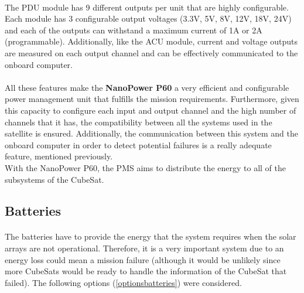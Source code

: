 \paragraph{}The PDU module has 9 different outputs per unit that are highly configurable. Each module has 3 configurable output voltages (3.3V, 5V, 8V, 12V, 18V, 24V) and each of the outputs can withstand a maximum current of 1A or 2A (programmable). Additionally, like the ACU module, current and voltage outputs are measured on each output channel and can be effectively communicated to the onboard computer.

\paragraph{}All these features make the \textbf{NanoPower P60} a very efficient and configurable power management unit that fulfills the mission requirements. Furthermore, given this capacity to configure each input and output channel and the high number of channels that it has, the compatibility between all the systems used in the satellite is ensured. Additionally, the communication between this system and the onboard computer in order to detect potential failures is a really adequate feature, mentioned previously.\\
With the NanoPower P60, the PMS aims to distribute the energy to all of the subsystems of the CubeSat.

\subsection{Batteries}

\paragraph{}	The batteries have to provide the energy that the system requires when the solar arrays are not operational. Therefore, it is a very important system due to an energy loss could mean a mission failure (although it would be unlikely since more CubeSats would be ready to handle the information of the CubeSat that failed). The following options (\ref{optionsbatteries}) were considered.


